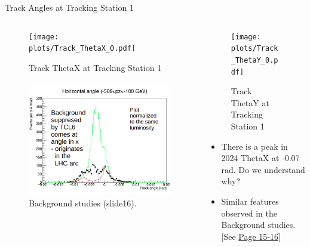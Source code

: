 \begin{frame}{Track Angles at Tracking Station 1}
	\begin{columns}
		\begin{column}{0.5\textwidth}
			\begin{figure}
				\texttt{[image: \\plots/Track\_ThetaX\_0.pdf]}
				\caption{Track ThetaX at Tracking Station 1}
			\end{figure}
			\vspace{-0.7cm}
			\begin{figure}
				\includegraphics[width=0.8\linewidth] {slide16.png}
				\vspace{-0.1cm}
				\caption{Background studies (slide16).}
			\end{figure}
		\end{column}
		\begin{column}{0.5\textwidth}
			\vspace{-0.7cm}
			\begin{figure}
				\texttt{[image: \\plots/Track\_ThetaY\_0.pdf]}
				\caption{Track ThetaY at Tracking Station 1}
			\end{figure}
			\begin{itemize}
				\item There is a peak in 2024 ThetaX at -0.07 rad. Do we understand why?
				\item Similar features observed in the Background studies. [See \href{https://indico.cern.ch/event/1350790/contributions/5686387/attachments/2836819/4957405/Introduction.pdf}{Page 15-16}]
			\end{itemize}
		\end{column}
	\end{columns}
	
\end{frame}

